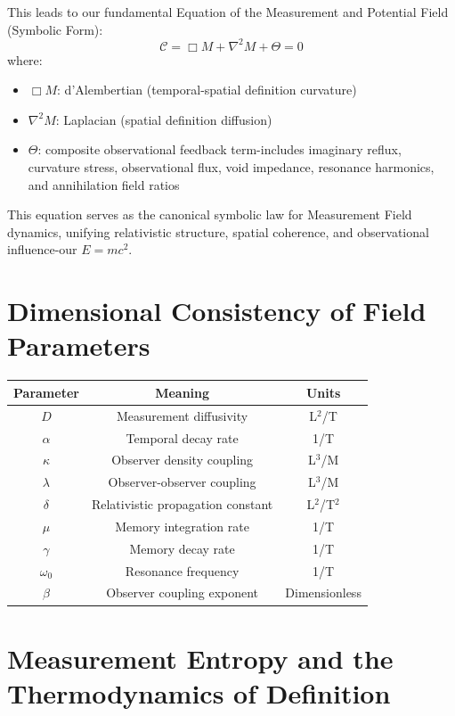 This leads to our fundamental Equation of the Measurement and Potential Field (Symbolic Form):
\begin{equation}
\boxed{\mathcal{C} = \Box M + \nabla^2 M + \Theta = 0}
\end{equation}
where:
\begin{itemize}
  \item $\Box M$: d'Alembertian (temporal-spatial definition curvature)
  \item $\nabla^2 M$: Laplacian (spatial definition diffusion)
  \item $\Theta$: composite observational feedback term-includes imaginary reflux, curvature stress, observational flux, void impedance, resonance harmonics, and annihilation field ratios
\end{itemize}

This equation serves as the canonical symbolic law for Measurement Field dynamics, unifying relativistic structure, spatial coherence, and observational influence-our $E=mc^2$.

\section{Dimensional Consistency of Field Parameters}

\begin{tabular}{|c|c|c|}
\hline
Parameter & Meaning & Units \\
\hline
$D$ & Measurement diffusivity & L$^2$/T \\
$\alpha$ & Temporal decay rate & 1/T \\
$\kappa$ & Observer density coupling & L$^3$/M \\
$\lambda$ & Observer-observer coupling & L$^3$/M \\
$\delta$ & Relativistic propagation constant & L$^2$/T$^2$ \\
$\mu$ & Memory integration rate & 1/T \\
$\gamma$ & Memory decay rate & 1/T \\
$\omega_0$ & Resonance frequency & 1/T \\
$\beta$ & Observer coupling exponent & Dimensionless \\
\hline
\end{tabular}

\section{Measurement Entropy and the Thermodynamics of Definition}

